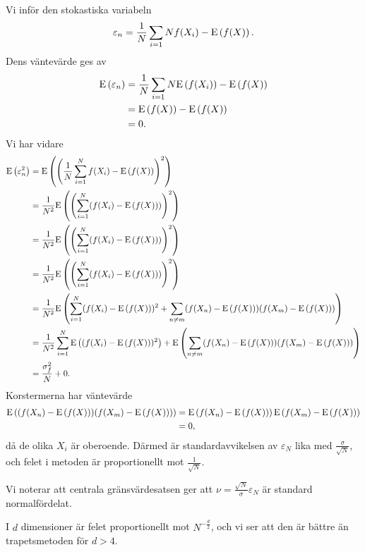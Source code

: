 Vi inför den stokastiska variabeln
\begin{align*}
	\varepsilon_{n} = \frac{1}{N}\sum\limits_{i = 1}{N}f(X_{i}) - \text{E}\left(f(X)\right).
\end{align*}
Dens väntevärde ges av
\begin{align*}
	\text{E}\left(\varepsilon_{n}\right) &= \frac{1}{N}\sum\limits_{i = 1}{N}\text{E}\left(f(X_{i})\right) - \text{E}\left(f(X)\right) \\
	                         &= \text{E}\left(f(X)\right) - \text{E}\left(f(X)\right) \\
	                         &= 0.
\end{align*}
Vi har vidare
\begin{align*}
	\text{E}\left(\varepsilon_{n}^{2}\right) &= \text{E}\left(\left(\frac{1}{N}\sum\limits_{i = 1}^{N}f(X_{i}) - \text{E}\left(f(X)\right)\right)^{2}\right) \\
	                         &= \frac{1}{N^{2}}\text{E}\left(\left(\sum\limits_{i = 1}^{N}(f(X_{i}) - \text{E}\left(f(X)\right))\right)^{2}\right) \\
	                         &= \frac{1}{N^{2}}\text{E}\left(\left(\sum\limits_{i = 1}^{N}(f(X_{i}) - \text{E}\left(f(X)\right))\right)^{2}\right) \\
	                         &= \frac{1}{N^{2}}\text{E}\left(\left(\sum\limits_{i = 1}^{N}(f(X_{i}) - \text{E}\left(f(X)\right))\right)^{2}\right) \\
	                         &= \frac{1}{N^{2}}\text{E}\left(\sum\limits_{i = 1}^{N}(f(X_{i}) - \text{E}\left(f(X)\right))^{2} + \sum\limits_{n\neq m}(f(X_{n}) - \text{E}\left(f(X)\right))(f(X_{m}) - \text{E}\left(f(X)\right))\right) \\
	                         &= \frac{1}{N^{2}}\sum\limits_{i = 1}^{N}\text{E}\left((f(X_{i}) - \text{E}\left(f(X)\right))^{2}\right) + \text{E}\left(\sum\limits_{n\neq m}(f(X_{n}) - \text{E}\left(f(X)\right))(f(X_{m}) - \text{E}\left(f(X)\right))\right) \\
	                         &= \frac{\sigma_{f}^{2}}{N} + 0.
\end{align*}
Korstermerna har väntevärde
\begin{align*}
	\text{E}\left((f(X_{n}) - \text{E}\left(f(X)\right))(f(X_{m}) - \text{E}\left(f(X)\right))\right) &= \text{E}\left(f(X_{n}) - \text{E}\left(f(X)\right)\right)\text{E}\left(f(X_{m}) - \text{E}\left(f(X)\right)\right) \\
	                                                           &= 0,
\end{align*}
då de olika $X_{i}$ är oberoende. Därmed är standardavvikelsen av $\varepsilon_{N}$ lika med $\frac{\sigma}{\sqrt{N}}$, och felet i metoden är proportionellt mot $\frac{1}{\sqrt{N}}$.

Vi noterar att centrala gränsvärdesatsen ger att $\nu = \frac{\sqrt{N}}{\sigma}\varepsilon_{N}$ är standard normalfördelat.

I $d$ dimensioner är felet proportionellt mot $N^{-\frac{d}{2}}$, och vi ser att den är bättre än trapetsmetoden för $d > 4$.